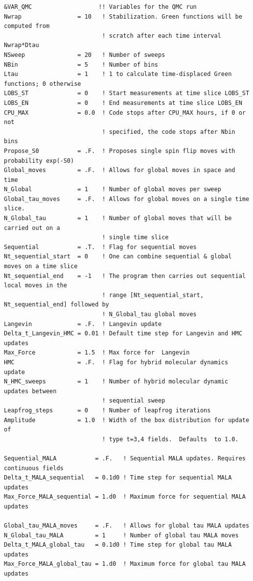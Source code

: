 \begin{lstlisting}[style=fortran,escapechar=\#,breaklines=true]
&VAR_QMC                   !! Variables for the QMC run
Nwrap                = 10   ! Stabilization. Green functions will be computed from 
                            ! scratch after each time interval Nwrap*Dtau
NSweep               = 20   ! Number of sweeps
NBin                 = 5    ! Number of bins
Ltau                 = 1    ! 1 to calculate time-displaced Green functions; 0 otherwise
LOBS_ST              = 0    ! Start measurements at time slice LOBS_ST
LOBS_EN              = 0    ! End measurements at time slice LOBS_EN
CPU_MAX              = 0.0  ! Code stops after CPU_MAX hours, if 0 or not
                            ! specified, the code stops after Nbin bins
Propose_S0           = .F.  ! Proposes single spin flip moves with probability exp(-S0) 
Global_moves         = .F.  ! Allows for global moves in space and time 
N_Global             = 1    ! Number of global moves per sweep 
Global_tau_moves     = .F.  ! Allows for global moves on a single time slice.  
N_Global_tau         = 1    ! Number of global moves that will be carried out on a 
                            ! single time slice
Sequential           = .T.  ! Flag for sequential moves
Nt_sequential_start  = 0    ! One can combine sequential & global moves on a time slice
Nt_sequential_end    = -1   ! The program then carries out sequential local moves in the
                            ! range [Nt_sequential_start, Nt_sequential_end] followed by
                            ! N_Global_tau global moves
Langevin             = .F.  ! Langevin update
Delta_t_Langevin_HMC = 0.01 ! Default time step for Langevin and HMC updates
Max_Force            = 1.5  ! Max force for  Langevin
HMC                  = .F.  ! Flag for hybrid molecular dynamics  update
N_HMC_sweeps         = 1    ! Number of hybrid molecular dynamic  updates between 
                            ! sequential sweep
Leapfrog_steps       = 0    ! Number of leapfrog iterations 
Amplitude            = 1.0  ! Width of the box distribution for update of 
                            ! type t=3,4 fields.  Defaults  to 1.0.

Sequential_MALA           = .F.   ! Sequential MALA updates. Requires continuous fields
Delta_t_MALA_sequential   = 0.1d0 ! Time step for sequential MALA updates
Max_Force_MALA_sequential = 1.d0  ! Maximum force for sequential MALA updates

Global_tau_MALA_moves     = .F.   ! Allows for global tau MALA updates
N_Global_tau_MALA         = 1     ! Number of global tau MALA moves
Delta_t_MALA_global_tau   = 0.1d0 ! Time step for global tau MALA updates
Max_Force_MALA_global_tau = 1.d0  ! Maximum force for global tau MALA updates


\end{lstlisting}
